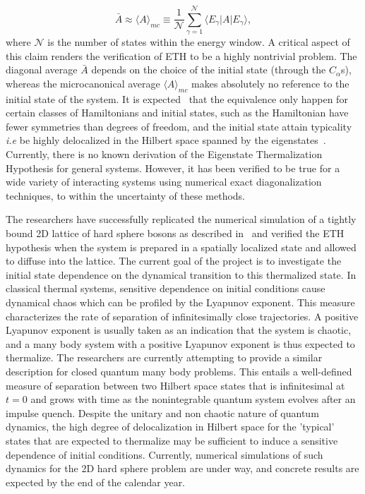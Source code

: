 \documentclass[a4paper,10pt]{report}
\begin{document}
\begin{equation}
\bar{A} \approx \langle A\rangle_{mc}\equiv \frac{1}{\mathcal N}\sum^{\mathcal N}_{\gamma=1} \langle E_\gamma|A|E_\gamma\rangle,
\end{equation}
where $\mathcal{N}$ is the number of states within the energy window. A critical aspect of this claim renders the verification of ETH to be a highly nontrivial problem. The diagonal average $\bar{A}$ depends on the choice of the initial state (through the $C_\alpha$s), whereas the microcanonical average $\langle A\rangle_{mc}$ makes absolutely no reference to the initial state of the system. It is expected~\cite{rigol:nature:etc} that the equivalence only happen for certain classes of Hamiltonians and initial states, such as the Hamiltonian have fewer symmetries than degrees of freedom, and the initial state attain typicality \textit{i.e} be highly delocalized in the Hilbert space spanned by the eigenstates~\cite{rigol:nature:etc}. Currently, there is no known derivation of the Eigenstate Thermalization Hypothesis for general systems. However, it has been verified to be true for a wide variety of interacting systems using numerical exact diagonalization techniques, to within the uncertainty of these methods. 

The researchers have successfully replicated the numerical simulation of a tightly bound 2D lattice of hard sphere bosons as described in~\cite{rigol:nature:etc} and verified the ETH hypothesis when the system is prepared in a spatially localized state and allowed to diffuse into the lattice. The current goal of the project is to investigate the initial state dependence on the dynamical transition to this thermalized state. In classical thermal systems, sensitive dependence on initial conditions cause dynamical chaos which can be profiled by the Lyapunov exponent. This measure characterizes the rate of separation of infinitesimally close trajectories. A positive Lyapunov exponent is usually taken as an indication that the system is chaotic, and a many body system with a positive Lyapunov exponent is thus expected to thermalize. The researchers are currently attempting to provide a similar description for closed quantum many body problems. This entails a well-defined measure of separation between two Hilbert space states that is infinitesimal at $t=0$ and grows with time as the nonintegrable quantum system evolves after an impulse quench. Despite the unitary and non chaotic nature of quantum dynamics, the high degree of delocalization in Hilbert space for the 'typical' states that are expected to thermalize may be sufficient to induce a sensitive dependence of initial conditions. Currently, numerical simulations of such dynamics for the 2D hard sphere problem are under way, and concrete results are expected by the end of the calendar year. 
\end{document}
